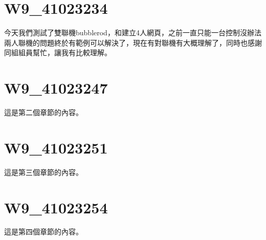 \documentclass{article}
\begin{document}
\section{W9\_41023234}

今天我們測試了雙聯機bubblerod，和建立4人網頁，之前一直只能一台控制沒辦法兩人聯機的問題終於有範例可以解決了，現在有對聯機有大概理解了，同時也感謝同組組員幫忙，讓我有比較理解。

\section{W9\_41023247}

這是第二個章節的內容。

\section{W9\_41023251}

這是第三個章節的內容。

\section{W9\_41023254}

這是第四個章節的內容。
\end{document}
